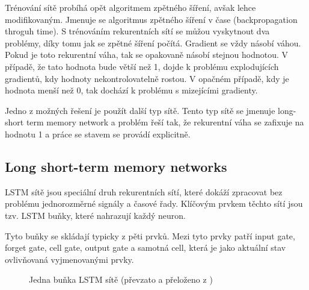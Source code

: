 \documentclass[FM,BP,fonts]{tulthesis}
\begin{document}
Trénování sítě probíhá opět algoritmem zpětného šíření, avšak lehce modifikovaným. Jmenuje se algoritmus zpětného šíření v čase (backpropagation throguh time). S trénováním rekurentních sítí se můžou vyskytnout dva problémy, díky tomu jak se zpětné šíření počítá. \cite{martinpilatRNN} Gradient se vždy násobí váhou. Pokud je toto rekurentní váha, tak se opakovaně násobí stejnou hodnotou. V případě, že tato hodnota bude větší než 1, dojde k problému explodujících gradientů, kdy hodnoty nekontrolovatelně rostou. V opačném případě, kdy je hodnota menší než 0, tak dochází k problému s mizejícími gradienty.

Jedno z možných řešení je použít další typ sítě. Tento typ sítě se jmenuje long-short term memory network a problém řeší tak, že rekurentní váha se zafixuje na hodnotu 1 a práce se stavem se provádí explicitně.



\subsection{Long short-term memory networks}\label{nn-lstm}
LSTM sítě jsou speciální druh rekurentních sítí, které dokáží zpracovat  bez problému jednorozměrné signály a časové řady. Klíčovým prvkem těchto sítí jsou tzv. LSTM buňky, které nahrazují každý neuron. 

Tyto buňky se skládají typicky z pěti prvků. Mezi tyto prvky patří input gate, forget gate, cell gate, output gate a samotná cell, která je jako aktuální stav ovlivňovaná vyjmenovanými prvky.

\begin{figure}[htbp]
	\centering
	\caption{Jedna buňka LSTM sítě (převzato a přeloženo z \cite{colah})}
	\label{fig:my_graph}
\end{figure}
\end{document}

